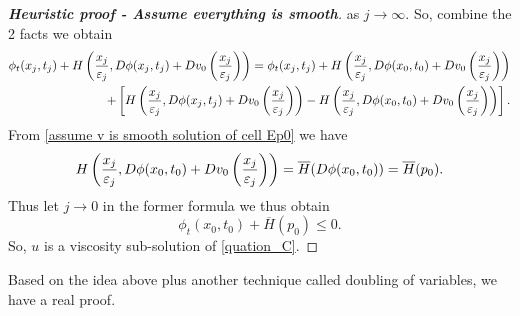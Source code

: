 \documentclass[12pt, oneside]{amsart}  	%
\begin{document}
\begin{proof}[\textbf{Heuristic proof - Assume everything is smooth}]
as $j\longrightarrow\infty$. So, combine the 2 facts we obtain
\begin{align*}
\phi_t(x_j, t_j) + H\left(\frac{x_j}{\varepsilon_j}, D\phi(x_j, t_j) + Dv_0\left(\frac{x_j}{\varepsilon_j}\right)\right) = \phi_t(x_j, t_j) + H\left(\frac{x_j}{\varepsilon_j}, D\phi(x_0, t_0) + Dv_0\left(\frac{x_j}{\varepsilon_j}\right)\right)\\
+ \left[H\left(\frac{x_j}{\varepsilon_j}, D\phi(x_j, t_j) + Dv_0\left(\frac{x_j}{\varepsilon_j}\right)\right)-H\left(\frac{x_j}{\varepsilon_j}, D\phi(x_0, t_0) + Dv_0\left(\frac{x_j}{\varepsilon_j}\right)\right)\right].
\end{align*}
From \eqref{assume v is smooth solution of cell Ep0} we have
\begin{equation*}
H\left(\frac{x_j}{\varepsilon_j}, D\phi(x_0, t_0) + Dv_0\left(\frac{x_j}{\varepsilon_j}\right)\right) = \overline{H}(D\phi(x_0,t_0)) = \overline{H}(p_0).
\end{equation*}
Thus let $j\longrightarrow 0$ in the former formula we thus obtain
\begin{equation*}
\phi_t(x_0, t_0) + \overline{H}(p_0)\le 0.
\end{equation*}
So, $u$ is a viscosity sub-solution of \eqref{quation_C}.
\end{proof}



Based on the idea above plus another technique called doubling of variables, we have a real proof.
\end{document}
